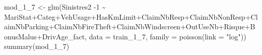 \documentclass[
]{article}
\newenvironment{Shaded}{\begin{snugshade}}{\end{snugshade}}
\newcommand{\AttributeTok}[1]{\textcolor[rgb]{0.77,0.63,0.00}{#1}}
\newcommand{\DecValTok}[1]{\textcolor[rgb]{0.00,0.00,0.81}{#1}}
\newcommand{\FunctionTok}[1]{\textcolor[rgb]{0.00,0.00,0.00}{#1}}
\newcommand{\NormalTok}[1]{#1}
\newcommand{\OtherTok}[1]{\textcolor[rgb]{0.56,0.35,0.01}{#1}}
\newcommand{\SpecialCharTok}[1]{\textcolor[rgb]{0.00,0.00,0.00}{#1}}
\newcommand{\StringTok}[1]{\textcolor[rgb]{0.31,0.60,0.02}{#1}}
\begin{document}
\begin{Shaded}
\begin{Highlighting}[]
\NormalTok{mod\_1\_7 }\OtherTok{\textless{}{-}} \FunctionTok{glm}\NormalTok{(Sinistres2 }\SpecialCharTok{{-}}\DecValTok{1} \SpecialCharTok{\textasciitilde{}}\NormalTok{ MariStat}\SpecialCharTok{+}\NormalTok{Categ}\SpecialCharTok{+}\NormalTok{VehUsage}\SpecialCharTok{+}\NormalTok{HasKmLimit}\SpecialCharTok{+}\NormalTok{ClaimNbResp}\SpecialCharTok{+}\NormalTok{ClaimNbNonResp}\SpecialCharTok{+}\NormalTok{ClaimNbParking}\SpecialCharTok{+}\NormalTok{ClaimNbFireTheft}\SpecialCharTok{+}\NormalTok{ClaimNbWindscreen}\SpecialCharTok{+}\NormalTok{OutUseNb}\SpecialCharTok{+}\NormalTok{Risque}\SpecialCharTok{+}\NormalTok{BonusMalus}\SpecialCharTok{+}\NormalTok{DrivAge\_fact, }\AttributeTok{data =}\NormalTok{ train\_1\_7, }\AttributeTok{family =} \FunctionTok{poisson}\NormalTok{(}\AttributeTok{link =} \StringTok{"log"}\NormalTok{))}
\FunctionTok{summary}\NormalTok{(mod\_1\_7)}
\end{Highlighting}
\end{Shaded}
\end{document}
